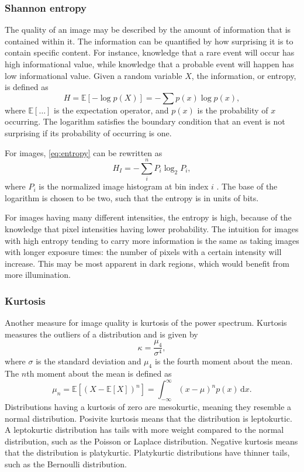 \subsubsection{Shannon entropy}
The quality of an image may be described by the amount of information that is contained within it.
The information can be quantified by how surprising it is to contain specific content.
For instance, knowledge that a rare event will occur has high informational value, while knowledge that a probable event will happen has low informational value.
Given a random variable $X$, the information, or entropy, is defined as
\begin{equation}\label{eq:entropy}
    H = \mathbb{E}[-\log p(X)] = -\sum p(x) \log p(x),
\end{equation}
where $\mathbb{E}[\ldots]$ is the expectation operator, and $p(x)$ is the probability of $x$ occurring.
The logarithm satisfies the boundary condition that an event is not surprising if its probability of occurring is one.

For images, \cref{eq:entropy} can be rewritten as
\begin{equation}
    H_I = -\sum_{i}^n P_i \log_2 P_i,
\end{equation}
where $P_i$ is the normalized image histogram at bin index $i$ .
The base of the logarithm is chosen to be two, such that the entropy is in units of bits.

For images having many different intensities, the entropy is high, because of the knowledge that pixel intensities having lower probability.
The intuition for images with high entropy tending to carry more information is the same as taking images with longer exposure times:
the number of pixels with a certain intensity will increase.
This may be most apparent in dark regions, which would benefit from more illumination.

\subsubsection{Kurtosis}
Another measure for image quality is kurtosis of the power spectrum.
Kurtosis measures the outliers of a distribution and is given by
\begin{equation}
    \kappa = \frac{\mu_4}{\sigma^4},
\end{equation}
where $\sigma$ is the standard deviation and $\mu_4$ is the fourth moment about the mean.
The $n$th moment about the mean is defined as
\begin{equation}
    \mu_n = \mathbb{E}[(X-\mathbb{E}[X])^n] = \int_{-\infty}^\infty (x-\mu)^n p(x)\,\mathrm{d}x.
\end{equation}
Distributions having a kurtosis of zero are mesokurtic, meaning they resemble a normal distribution.
Posivite kurtosis means that the distribution is leptokurtic.
A leptokurtic distribution has tails with more weight compared to the normal distribution, such as the Poisson or Laplace distribution.
Negative kurtosis means that the distribution is platykurtic.
Platykurtic distributions have thinner tails, such as the Bernoulli distribution.

